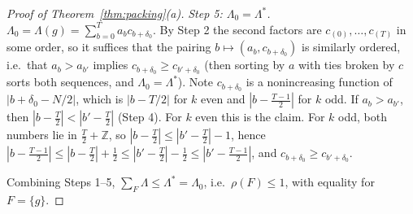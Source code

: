 \documentclass[11pt]{article}
\newcommand{\Z}{\mathbb{Z}}
\theoremstyle{definition}
\theoremstyle{remark}
\begin{document}
\begin{proof}[Proof of Theorem~\ref{thm:packing}(a)]
\emph{Step 5: $\Lambda_0=\Lambda^\ast$.} $\Lambda_0=\Lambda(g)=\sum_{b=0}^Ta_bc_{b+\delta_0}$. By Step 2 the second factors are $c_{(0)},\dots,c_{(T)}$ in some
order, so it suffices that the pairing $b\mapsto(a_b,c_{b+\delta_0})$ is similarly ordered, i.e.\ that $a_b>a_{b'}$ implies $c_{b+\delta_0}\ge c_{b'+\delta_0}$
(then sorting by $a$ with ties broken by $c$ sorts both sequences, and $\Lambda_0=\Lambda^\ast$). Note $c_{b+\delta_0}$ is a nonincreasing function of
$|b+\delta_0-N/2|$, which is $|b-T/2|$ for $k$ even and $|b-\frac{T-1}2|$ for $k$ odd. If $a_b>a_{b'}$, then $|b-\frac T2|<|b'-\frac T2|$ (Step 4).
For $k$ even this is the claim. For $k$ odd, both numbers lie in $\frac T2+\Z$, so $|b-\frac T2|\le|b'-\frac T2|-1$, hence
$|b-\frac{T-1}2|\le|b-\frac T2|+\frac12\le|b'-\frac T2|-\frac12\le|b'-\frac{T-1}2|$, and $c_{b+\delta_0}\ge c_{b'+\delta_0}$.

Combining Steps 1--5, $\sum_F\Lambda\le\Lambda^\ast=\Lambda_0$, i.e.\ $\rho(F)\le1$, with equality for $F=\{g\}$.
\end{proof}
\end{document}
